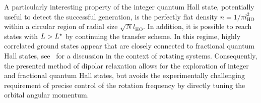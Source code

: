 A particularly interesting property of the integer quantum Hall state, potentially useful to detect the successful generation, is the perfectly flat density $n=1/\pi l_\text{HO}^2$ within a circular region of radial size $\sqrt{N}l_\text{HO}$.
In addition, it is possible to reach states with $L>L^{\star}$ by continuing the transfer scheme.
In this regime,
highly correlated ground states appear that are closely connected to fractional quantum Hall states, see~\cite{Osterloh2007} for a discussion in the context of rotating systems. Consequently, the presented method of dipolar relaxation allows for the exploration of integer and fractional quantum Hall states, but avoids the experimentally challenging requirement of precise control of the rotation frequency by directly tuning the orbital angular momentum.






